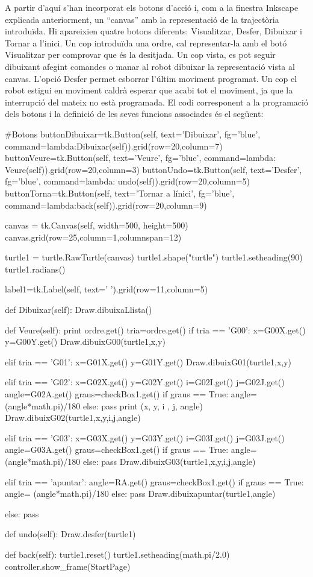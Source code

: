 A partir d’aquí s’han incorporat els botons d’acció i, com a la finestra Inkscape explicada anteriorment, un “canvas” amb la representació de la trajectòria introduïda. Hi apareixien quatre botons diferents: Visualitzar, Desfer, Dibuixar i Tornar a l’inici. Un cop introduïda una ordre, cal representar-la amb el botó Visualitzar per comprovar que és la desitjada. Un cop vista, es pot seguir dibuixant afegint comandes o manar al robot dibuixar la representació vista al canvas. L’opció Desfer permet esborrar l’últim moviment programat. Un cop el robot estigui en moviment caldrà esperar que acabi tot el moviment, ja que la interrupció del mateix no està programada. El codi corresponent a la programació dels botons i la definició de les seves funcions associades és el següent:

\begin{python}
	#Botons
	buttonDibuixar=tk.Button(self, text='Dibuixar', fg='blue', command=lambda:Dibuixar(self)).grid(row=20,column=7)
	buttonVeure=tk.Button(self, text='Veure', fg='blue', command=lambda: Veure(self)).grid(row=20,column=3)
	buttonUndo=tk.Button(self, text='Desfer', fg='blue', command=lambda: undo(self)).grid(row=20,column=5)
	buttonTorna=tk.Button(self, text='Tornar a l\'inici', fg='blue', command=lambda:back(self)).grid(row=20,column=9)
	
	canvas = tk.Canvas(self, width=500, height=500)
	canvas.grid(row=25,column=1,columnspan=12)
	
	turtle1 = turtle.RawTurtle(canvas)
	turtle1.shape("turtle")
	turtle1.setheading(90)
	turtle1.radians()
	
	label1=tk.Label(self, text='          ').grid(row=11,column=5)
	
	
	
	
	def Dibuixar(self):
	Draw.dibuixaLlista()
	
	
	def Veure(self):
	print ordre.get()
	tria=ordre.get()
	if tria == 'G00':
	x=G00X.get()
	y=G00Y.get()
	Draw.dibuixG00(turtle1,x,y)
	
	elif tria == 'G01':
	x=G01X.get()
	y=G01Y.get()
	Draw.dibuixG01(turtle1,x,y)
	
	elif tria == 'G02':
	x=G02X.get()
	y=G02Y.get()
	i=G02I.get()
	j=G02J.get()
	angle=G02A.get()
	graus=checkBox1.get()
	if graus == True:
	angle= (angle*math.pi)/180
	else:
	pass
	print (x, y, i , j, angle)
	Draw.dibuixG02(turtle1,x,y,i,j,angle)
	
	elif tria == 'G03':
	x=G03X.get()
	y=G03Y.get()
	i=G03I.get()
	j=G03J.get()
	angle=G03A.get()
	graus=checkBox1.get()
	if graus == True:
	angle= (angle*math.pi)/180
	else:
	pass
	Draw.dibuixG03(turtle1,x,y,i,j,angle)
	
	elif tria == 'apuntar':
	angle=RA.get()
	graus=checkBox1.get()
	if graus == True:
	angle= (angle*math.pi)/180
	else:
	pass
	Draw.dibuixapuntar(turtle1,angle)
	
	else:
	pass
	
	def undo(self):
	Draw.desfer(turtle1)
	
	
	def back(self):
	turtle1.reset()
	turtle1.setheading(math.pi/2.0)
	controller.show_frame(StartPage)
\end{python}

